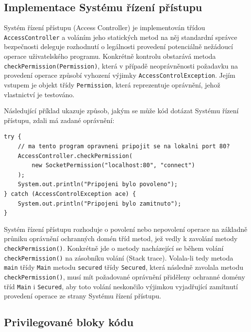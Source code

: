 \subsection{Implementace Systému řízení přístupu}\label{implementaceAC}

Systém řízení přístupu (Access Controller) je implementován třídou {\tt AccessController} a voláním jeho statických metod na něj standardní správce bezpečnosti deleguje rozhodnutí o legálnosti provedení potenciálně nežádoucí operace uživatelského programu. Konkrétně kontrolu obstarává metoda {\tt checkPermission(Permission)}, která v případě neoprávněnosti požadavku na provedení operace způsobí vyhození výjimky {\tt AccessControlException}. Jejím vstupem je objekt třídy {\tt Permission}, která reprezentuje oprávnění, jehož vlastnictví je testováno. \cite[5.5]{oaks}\cite[6]{oaks}

Následující příklad ukazuje způsob, jakým se může kód dotázat Systému řízení přístupu, zdali má zadané oprávnění: \cite[5.5]{oaks}

\begin{lstlisting}[caption=Příklad použití Systému řízení přístupu, label=pouzitiAC]
try {
    // ma tento program opravneni pripojit se na lokalni port 80?
    AccessController.checkPermission(
        new SocketPermission("localhost:80", "connect")
    );
    System.out.println("Pripojeni bylo povoleno");
} catch (AccessControlException ace) {
    System.out.println("Pripojeni bylo zamitnuto");
}
\end{lstlisting}

Systém řízení přístupu rozhoduje o povolení nebo nepovolení operace na základně průniku oprávnění ochranných domén tříd metod, jež vedly k zavolání metody {\tt checkPermission()}. Konkrétně jde o metody nacházející se během volání {\tt checkPermission()} na zásobníku volání (Stack trace). Volala-li tedy metoda {\tt main} třídy {\tt Main} metodu {\tt secured} třídy {\tt Secured}, která následně zavolala metodu {\tt checkPermission()}, musí mít požadované oprávnění přiděleny ochranné domény tříd {\tt Main} i {\tt Secured}, aby toto volání neskončilo výjimkou vyjadřující zamítnutí provedení operace ze strany Systému řízení přístupu. \cite[5.5]{oaks}\cite[6.1]{oaks}

\subsection{Privilegované bloky kódu}\label{privilegovaneBloky}

